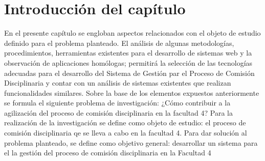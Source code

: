 \section{Introducción del capítulo}
En el presente capítulo se engloban aspectos relacionados con el objeto de estudio definido para el problema planteado. El análisis de algunas metodologías, procedimientos, herramientas existentes para el desarrollo de sistemas web y la observación de aplicaciones homólogas; permitirá la selección de las tecnologías adecuadas para el desarrollo del Sistema de Gestión par el Proceso de Comisión Disciplinaria y contar con un análisis de sistemas existentes que realizan funcionalidades similares.
Sobre la base de los elementos expuestos anteriormente se formula el siguiente problema de investigación: ¿Cómo contribuir a la agilización del proceso de comisión disciplinaria en la facultad 4? Para la realización de la investigación se define como objeto de estudio: el proceso de comisión disciplinaria qe se lleva a cabo en la facultad 4.
Para dar solución al problema planteado, se define como objetivo general: desarrollar un sistema para el la gestión del proceso de comisión disciplinaria en la Facultad 4 